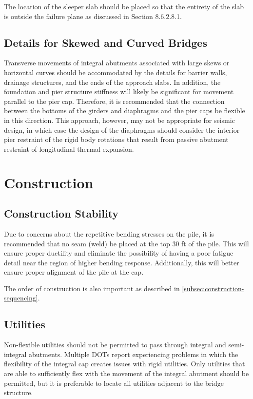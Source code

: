 The location of the sleeper slab should be placed so that the entirety of the slab is outside the failure plane as discussed in Section 8.6.2.8.1.

\subsection{Details for Skewed and Curved Bridges}
Transverse movements of integral abutments associated with large skews or horizontal curves should be accommodated by the details for barrier walls, drainage structures, and the ends of the approach slabs. In addition, the foundation and pier structure stiffness will likely be significant for movement parallel to the pier cap. Therefore, it is recommended that the connection between the bottoms of the girders and diaphragms and the pier caps be flexible in this direction. This approach, however, may not be appropriate for seismic design, in which case the design of the diaphragms should consider the interior pier restraint of the rigid body rotations that result from passive abutment restraint of longitudinal thermal expansion.


\section{Construction}
\subsection{Construction Stability}
Due to concerns about the repetitive bending stresses on the pile, it is recommended that no seam (weld) be
placed at the top 30 ft of the pile. This will ensure proper ductility and eliminate the possibility of having a poor
fatigue detail near the region of higher bending response. Additionally, this will better ensure proper alignment of the
pile at the cap.

The order of construction is also important as described in \cref{subsec:construction-sequencing}.

\subsection{Utilities}
Non-flexible utilities should not be permitted to pass through integral and semi-integral abutments. Multiple
DOTs report experiencing problems in which the flexibility of the integral cap creates issues with rigid utilities. Only
utilities that are able to sufficiently flex with the movement of the integral abutment should be permitted, but it is
preferable to locate all utilities adjacent to the bridge structure.

